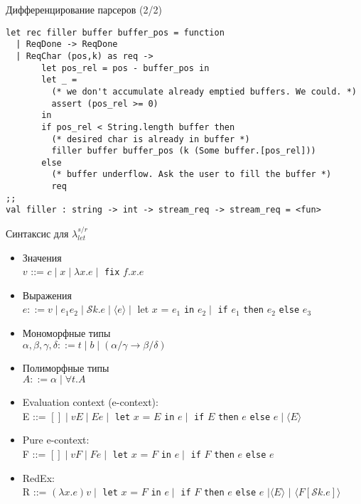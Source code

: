 \documentclass{beamer}
\begin{document}
\begin{frame}[fragile]{Дифференцирование парсеров (2/2)} 

\begin{lstlisting}[style={camlstyle1}]
let rec filler buffer buffer_pos = function 
  | ReqDone -> ReqDone
  | ReqChar (pos,k) as req ->
       let pos_rel = pos - buffer_pos in
       let _ = 
         (* we don't accumulate already emptied buffers. We could. *)
         assert (pos_rel >= 0) 
       in
       if pos_rel < String.length buffer then
         (* desired char is already in buffer *)
         filler buffer buffer_pos (k (Some buffer.[pos_rel])) 
       else
         (* buffer underflow. Ask the user to fill the buffer *)
         req
;;
val filler : string -> int -> stream_req -> stream_req = <fun>
\end{lstlisting}
\end{frame}


\begin{frame}[fragile]{Синтаксис для $\lambda_{let}^{s/r}$}
\begin{itemize}
 \item Значения \\
 $v$ ::= $c \mid x \mid \lambda x.e \mid $ \verb=fix= $f.x.e$
 \item Выражения \\
$e ::= v \mid e_1e_2\mid \mathcal{S}k.e \mid \langle e\rangle \mid$ let $x$ = $e_1$ \verb=in= $e_2 \mid $ \verb=if= $e_1$ \verb=then= $e_2$ \verb=else= $e_3$
\item Мономорфные типы\\
$\alpha,\beta,\gamma,\delta ::= t \mid b \mid (\alpha/\gamma \rightarrow \beta/\delta)$
\item Полиморфные типы\\
$A::= \alpha \mid \forall t . A$

\item Evaluation context (e-context):\\
E ::= $[] \mid vE \mid Ee \mid $ 
\verb=let= $x$ = $E$ \verb=in= $e \mid $
\verb=if= $E$ \verb=then= $e$ \verb=else= $e \mid
\langle E\rangle  $

\item Pure e-context:\\
F ::= $[] \mid vF \mid Fe \mid $ 
\verb=let= $x$ = $F$ \verb=in= $e \mid $
\verb=if= $F$ \verb=then= $e$ \verb=else= $e$

\item RedEx:\\ 
R ::= $(\lambda x.e)v \mid$ \verb=let= $x$ = $F$ \verb=in= $e \mid $
\verb=if= $F$ \verb=then= $e$ \verb=else= $e$ $\mid \langle E\rangle$ $\mid $ $\langle F[\mathcal{S}k.e]\rangle$
\end{itemize}
\end{frame}
\end{document}
